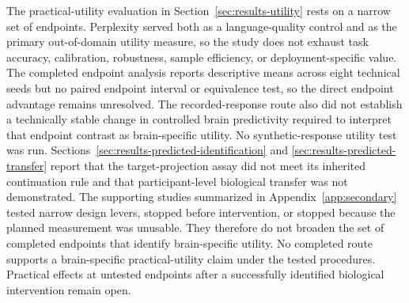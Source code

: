 The practical-utility evaluation in Section~\ref{sec:results-utility} rests on a narrow set of endpoints.
Perplexity served both as a language-quality control and as the primary out-of-domain utility measure, so the study does not exhaust task accuracy, calibration, robustness, sample efficiency, or deployment-specific value.
The completed endpoint analysis reports descriptive means across eight technical seeds but no paired endpoint interval or equivalence test, so the direct endpoint advantage remains unresolved.
The recorded-response route also did not establish a technically stable change in controlled brain predictivity required to interpret that endpoint contrast as brain-specific utility.
No synthetic-response utility test was run.
Sections~\ref{sec:results-predicted-identification} and \ref{sec:results-predicted-transfer} report that the target-projection assay did not meet its inherited continuation rule and that participant-level biological transfer was not demonstrated.
The supporting studies summarized in Appendix~\ref{app:secondary} tested narrow design levers, stopped before intervention, or stopped because the planned measurement was unusable.
They therefore do not broaden the set of completed endpoints that identify brain-specific utility.
No completed route supports a brain-specific practical-utility claim under the tested procedures.
Practical effects at untested endpoints after a successfully identified biological intervention remain open.
